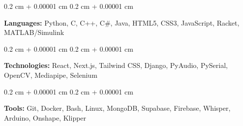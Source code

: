 \documentclass[10pt, letterpaper]{article}
\newenvironment{onecolentry}{
    \begin{adjustwidth}{
        0.2 cm + 0.00001 cm
    }{
        0.2 cm + 0.00001 cm
    }
}{
    \end{adjustwidth}
} %
\begin{document}
        
        \begin{onecolentry}
            \textbf{Languages:} Python, C, C++, C\#, Java, HTML5, CSS3, JavaScript, Racket, MATLAB/Simulink
        \end{onecolentry}

        \vspace{0.1 cm}

        \begin{onecolentry}
            \textbf{Technologies:} React, Next.js, Tailwind CSS, Django, PyAudio, PySerial, OpenCV, Mediapipe, Selenium \end{onecolentry}

        \vspace{0.1 cm}

        \begin{onecolentry}
            \textbf{Tools:} Git, Docker, Bash, Linux, MongoDB, Supabase, Firebase, Whisper, Arduino, Onshape, Klipper\end{onecolentry}
\end{document}
